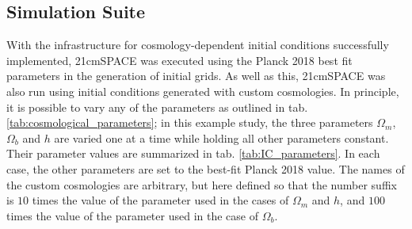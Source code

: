 \documentclass[floats,floatfix,showpacs,amssymb,prd,superscriptaddress,nofootinbib]{revtex4-2} %
\begin{document}
\subsection{Simulation Suite}
With the infrastructure for cosmology-dependent initial conditions successfully implemented, 21cmSPACE was executed using the Planck 2018 best fit parameters \citep{Planck2018results} in the generation of initial grids. As well as this, 21cmSPACE was also run using initial conditions generated with custom cosmologies. In principle, it is possible to vary any of the parameters as outlined in tab. \ref{tab:cosmological_parameters}; in this example study, the three parameters $\Omega_m$, $\Omega_b$ and $h$ are varied one at a time while holding all other parameters constant. Their parameter values are summarized in tab. \ref{tab:IC_parameters}. In each case, the other parameters are set to the best-fit Planck 2018 value. The names of the custom cosmologies are arbitrary, but here defined so that the number suffix is $10$ times the value of the parameter used in the cases of $\Omega_m$ and $h$, and $100$ times the value of the parameter used in the case of $\Omega_b$. 
\end{document}
